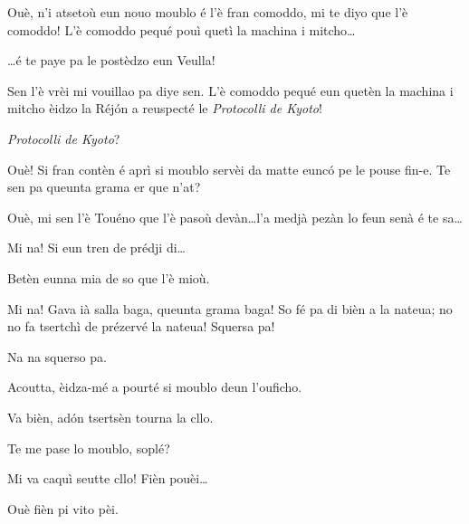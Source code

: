 \begin{drama}
\Richardspeaks Ouè, n'i atsetoù eun nouo moublo é l'è fran comoddo,  mi te diyo que l'è comoddo! L'è comoddo pequé pouì quetì la machina i mitcho\ldots

\Sandrinospeaks \ldots é te paye pa le postèdzo eun Veulla!

\Richardspeaks Sen l'è vrèi mi vouillao pa diye sen. L'è comoddo pequé eun quetèn la machina i mitcho èidzo la Réj\'on a reuspecté le \textit{Protocolli de Kyoto}! 

\Sandrinospeaks \textit{Protocolli de Kyoto}?

\Richardspeaks Ouè! Si fran contèn é aprì si moublo servèi da matte eunc\'o pe le pouse fin-e. Te sen pa  queunta grama er que n'at? 

\Sandrinospeaks Ouè, mi sen l'è Touéno que l'è pasoù devàn\ldots l'a medjà pezàn lo feun senà é te sa\ldots

\Richardspeaks Mi na! Si eun tren de prédji di\ldots


\Sandrinospeaks Betèn eunna mia de so que l'è mioù.

\Richardspeaks Mi na! Gava ià salla baga, queunta grama baga! So fé pa di bièn a la nateua; no no fa tsertchì de prézervé la nateua! Squersa pa!

\Sandrinospeaks Na na squerso pa.

\Richardspeaks Acoutta, èidza-mé a pourté si moublo deun l'ouficho.

\Sandrinospeaks Va bièn, ad\'on tsertsèn tourna la cllo.


\Richardspeaks Te me pase lo moublo, soplé?


\Sandrinospeaks{} Mi va caquì seutte cllo! Fièn pouèi\ldots


\Richardspeaks{} Ouè fièn pi vito pèi.




\end{drama}
